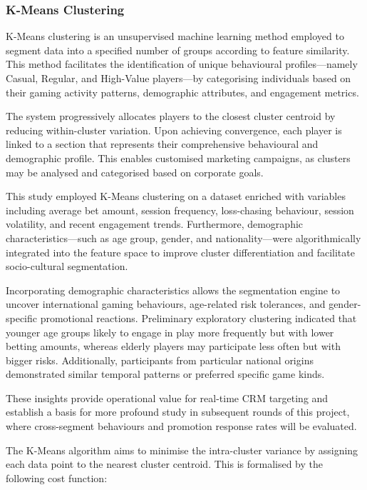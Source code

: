 \documentclass[12pt,a4paper]{report}
\begin{document}
\subsubsection{K-Means Clustering}

K-Means clustering is an unsupervised machine learning method employed to segment data into a specified number of groups according to feature similarity.  This method facilitates the identification of unique behavioural profiles—namely Casual, Regular, and High-Value players—by categorising individuals based on their gaming activity patterns, demographic attributes, and engagement metrics.

 The system progressively allocates players to the closest cluster centroid by reducing within-cluster variation.  Upon achieving convergence, each player is linked to a section that represents their comprehensive behavioural and demographic profile.  This enables customised marketing campaigns, as clusters may be analysed and categorised based on corporate goals.

 This study employed K-Means clustering on a dataset enriched with variables including average bet amount, session frequency, loss-chasing behaviour, session volatility, and recent engagement trends.  Furthermore, demographic characteristics—such as age group, gender, and nationality—were algorithmically integrated into the feature space to improve cluster differentiation and facilitate socio-cultural segmentation.

 Incorporating demographic characteristics allows the segmentation engine to uncover international gaming behaviours, age-related risk tolerances, and gender-specific promotional reactions.  Preliminary exploratory clustering indicated that younger age groups likely to engage in play more frequently but with lower betting amounts, whereas elderly players may participate less often but with bigger risks.  Additionally, participants from particular national origins demonstrated similar temporal patterns or preferred specific game kinds.

 These insights provide operational value for real-time CRM targeting and establish a basis for more profound study in subsequent rounds of this project, where cross-segment behaviours and promotion response rates will be evaluated.

The K-Means algorithm aims to minimise the intra-cluster variance by assigning each data point to the nearest cluster centroid. This is formalised by the following cost function:
\end{document}

